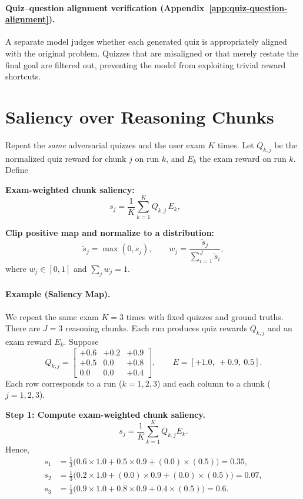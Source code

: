 \documentclass[12pt]{report}
\begin{document}
\paragraph{Quiz--question alignment verification (Appendix~\ref{app:quiz-question-alignment}).}
A separate model judges whether each generated quiz is appropriately aligned with the original problem. Quizzes that are misaligned or that merely restate the final goal are filtered out, preventing the model from exploiting trivial reward shortcuts.

\section{Saliency over Reasoning Chunks}
\label{sec:saliency_over_chunk}
Repeat the \emph{same} adversarial quizzes and the user exam $K$ times. Let $Q_{k,j}$ be the normalized quiz reward for chunk $j$ on run $k$, and $E_k$ the exam reward on run $k$. Define

\medskip
\noindent\textbf{Exam-weighted chunk saliency:}
\begin{equation}\label{eq:exam-weighted-saliency-formula}
s_j=\frac{1}{K}\sum_{k=1}^{K} Q_{k,j}\,E_k,\qquad
\end{equation}

\noindent\textbf{Clip positive map and normalize to a distribution:}
\begin{equation}
\tilde{s}_j=\max(0,s_j),\qquad
w_j=\frac{\tilde{s}_j}{\sum_{i=1}^{J}\tilde{s}_i},
\end{equation}
where $w_j\in[0,1]$ and $\sum_j w_j=1$.

\paragraph{Example (Saliency Map).}
We repeat the same exam $K=3$ times with fixed quizzes and ground truths.
There are $J=3$ reasoning chunks. Each run produces quiz rewards $Q_{k,j}$
and an exam reward $E_k$. Suppose
\begin{equation}
Q_{k,j} =
\begin{bmatrix}
+0.6 & +0.2 & +0.9\\
+0.5 & 0.0 & +0.8\\
0.0 & 0.0 & +0.4
\end{bmatrix},
\qquad
E = [ +1.0,\ +0.9,\ 0.5 ].
\end{equation}
Each row corresponds to a run ($k=1,2,3$) and each column to a chunk ($j=1,2,3$).

\noindent\textbf{Step 1: Compute exam-weighted chunk saliency.}
\begin{equation}
s_j=\frac{1}{K}\sum_{k=1}^{K} Q_{k,j}E_k.
\end{equation}
Hence,
\begin{align}
s_1 &= \frac{1}{3}\bigl(0.6\times1.0 + 0.5\times0.9 + (0.0)\times(0.5)\bigr)=0.35,\\
s_2 &= \frac{1}{3}\bigl(0.2\times1.0 + (0.0)\times0.9 + (0.0)\times(0.5)\bigr)=0.07,\\
s_3 &= \frac{1}{3}\bigl(0.9\times1.0 + 0.8\times0.9 + 0.4\times(0.5)\bigr)=0.6.
\end{align}
\end{document}
